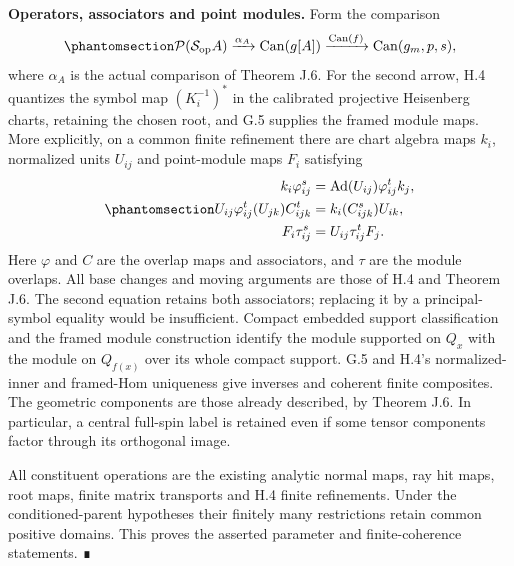 \documentclass[
  english,
  11pt,
  reqno]{amsart}
\begin{document}
\textbf{Operators, associators and point modules.} Form the comparison
\begin{equation}\protect\phantomsection\label{eq:schw-bc-enriched-map}{
 \mathcal P(\mathcal S_{\mathrm{op}}A)
 \xrightarrow{\alpha_A}\operatorname{Can}(g[A])
 \xrightarrow{\operatorname{Can}(f)}\operatorname{Can}(g_m,p,s),
}\end{equation} where \(\alpha_A\) is the actual comparison of Theorem
J.6. For the second arrow, H.4 quantizes the symbol map \((K_i^{-1})^*\)
in the calibrated projective Heisenberg charts, retaining the chosen
root, and G.5 supplies the framed module maps. More explicitly, on a
common finite refinement there are chart algebra maps \(k_i\),
normalized units \(U_{ij}\) and point-module maps \(F_i\) satisfying
\begin{equation}\protect\phantomsection\label{eq:schw-bc-actual-operator-comparison}{
 \begin{aligned}
 k_i\varphi^s_{ij}
    &=\operatorname{Ad}(U_{ij})\varphi^t_{ij}k_j,\\
 U_{ij}\varphi^t_{ij}(U_{jk})C^t_{ijk}
    &=k_i(C^s_{ijk})U_{ik},\\
 F_i\tau^s_{ij}&=U_{ij}\tau^t_{ij}F_j.
 \end{aligned}
}\end{equation} Here \(\varphi\) and \(C\) are the overlap maps and
associators, and \(\tau\) are the module overlaps. All base changes and
moving arguments are those of H.4 and Theorem J.6. The second equation
retains both associators; replacing it by a principal-symbol equality
would be insufficient. Compact embedded support classification and the
framed module construction identify the module supported on \(Q_x\) with
the module on \(Q_{f(x)}\) over its whole compact support. G.5 and H.4's
normalized-inner and framed-Hom uniqueness give inverses and coherent
finite composites. The geometric components are those already described,
by Theorem J.6. In particular, a central full-spin label is retained
even if some tensor components factor through its orthogonal image.

All constituent operations are the existing analytic normal maps, ray
hit maps, root maps, finite matrix transports and H.4 finite
refinements. Under the conditioned-parent hypotheses their finitely many
restrictions retain common positive domains. This proves the asserted
parameter and finite-coherence statements. ∎

\protect{}\label{sec:schw-bc-finite-coherence}
\end{document}

